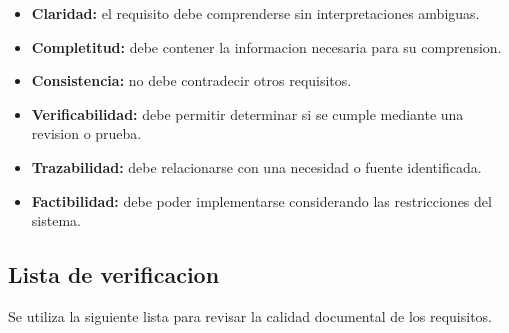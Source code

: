 \documentclass[11pt,a4paper]{article}
\begin{document}
\begin{itemize}

    \item \textbf{Claridad:} el requisito debe
    comprenderse sin interpretaciones ambiguas.

    \item \textbf{Completitud:} debe contener
    la informacion necesaria para su comprension.

    \item \textbf{Consistencia:} no debe contradecir
    otros requisitos.

    \item \textbf{Verificabilidad:} debe permitir
    determinar si se cumple mediante una revision
    o prueba.

    \item \textbf{Trazabilidad:} debe relacionarse
    con una necesidad o fuente identificada.

    \item \textbf{Factibilidad:} debe poder
    implementarse considerando las restricciones
    del sistema.

\end{itemize}

\subsection{Lista de verificacion}

Se utiliza la siguiente lista para revisar
la calidad documental de los requisitos.
\end{document}
